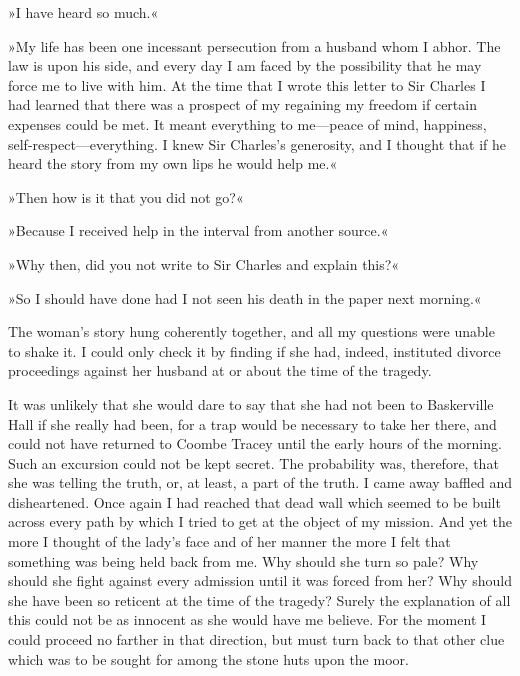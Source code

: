 »I have heard so much.«

»My life has been one incessant persecution from a husband whom I abhor. The law is upon his side, and every day I am faced by the possibility that he may force me to live with him. At the time that I wrote this letter to Sir Charles I had learned that there was a prospect of my regaining my freedom if certain expenses could be met. It meant everything to me—peace of mind, happiness, self-respect—everything. I knew Sir Charles's generosity, and I thought that if he heard the story from my own lips he would help me.«

»Then how is it that you did not go?«

»Because I received help in the interval from another source.«

»Why then, did you not write to Sir Charles and explain this?«

»So I should have done had I not seen his death in the paper next morning.«

The woman's story hung coherently together, and all my questions were unable to shake it. I could only check it by finding if she had, indeed, instituted divorce proceedings against her husband at or about the time of the tragedy.

It was unlikely that she would dare to say that she had not been to Baskerville Hall if she really had been, for a trap would be necessary to take her there, and could not have returned to Coombe Tracey until the early hours of the morning. Such an excursion could not be kept secret. The probability was, therefore, that she was telling the truth, or, at least, a part of the truth. I came away baffled and disheartened. Once again I had reached that dead wall which seemed to be built across every path by which I tried to get at the object of my mission. And yet the more I thought of the lady's face and of her manner the more I felt that something was being held back from me. Why should she turn so pale? Why should she fight against every admission until it was forced from her? Why should she have been so reticent at the time of the tragedy? Surely the explanation of all this could not be as innocent as she would have me believe. For the moment I could proceed no farther in that direction, but must turn back to that other clue which was to be sought for among the stone huts upon the moor.

